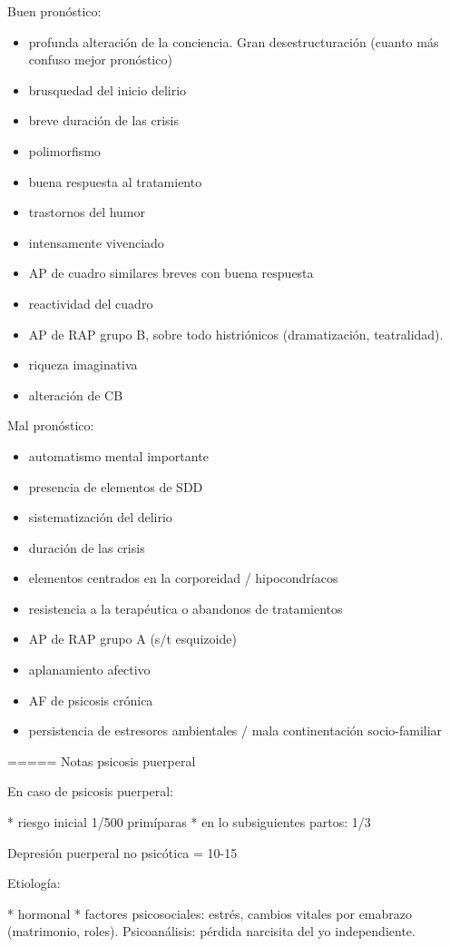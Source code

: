 \documentclass{scrbook}
\begin{document}
Buen pronóstico:
\begin{itemize}
\item profunda alteración de la conciencia. Gran desestructuración (cuanto más confuso mejor pronóstico)
\item brusquedad del inicio delirio
\item breve duración de las crisis
\item polimorfismo
\item buena respuesta al tratamiento
\item trastornos del humor
\item intensamente vivenciado
\item AP de cuadro similares breves con buena respuesta
\item reactividad del cuadro
\item AP de RAP grupo B, sobre todo histriónicos (dramatización, teatralidad).
\item riqueza imaginativa
\item alteración de CB
\end{itemize}
Mal pronóstico:
\begin{itemize}
	\item automatismo mental importante
	\item presencia de elementos de SDD
	\item sistematización del delirio
	\item duración de las crisis
	\item elementos centrados en la corporeidad / hipocondríacos
	\item resistencia a la terapéutica o abandonos de tratamientos
	\item AP de RAP grupo A (s/t esquizoide)
	\item aplanamiento afectivo
	\item AF de psicosis crónica
	\item persistencia de estresores ambientales / mala continentación socio-familiar
\end{itemize}

===== Notas psicosis puerperal

En caso de psicosis puerperal:

* riesgo inicial 1/500 primíparas
* en lo subsiguientes partos: 1/3

Depresión puerperal no psicótica = 10-15%

Etiología:

* hormonal
* factores psicosociales: estrés, cambios vitales por emabrazo (matrimonio, roles). Psicoanálisis: pérdida narcisita del yo independiente.
\end{document}

